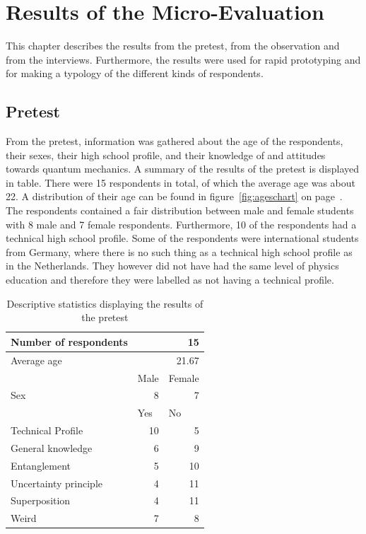\documentclass[11pt,twoside]{report} %
\begin{document}
\chapter{Results of the Micro-Evaluation}

This chapter describes the results from the pretest, from the observation and from the interviews. Furthermore, the results were used for rapid prototyping and for making a typology of the different kinds of respondents.

\section{Pretest}

From the pretest, information was gathered about the age of the respondents, their sexes, their high school profile, and their knowledge of and attitudes towards quantum mechanics. A summary of the results of the pretest is displayed in table. There were 15 respondents in total, of which the average age was about 22. A distribution of their age can be found in figure~\ref{fig:ageschart} on page~\pageref{fig:ageschart}. The respondents contained a fair distribution between male and female students with 8 male and 7 female respondents. Furthermore, 10 of the respondents had a technical high school profile. Some of the respondents were international students from Germany, where there is no such thing as a technical high school profile as in the Netherlands. They however did not have had the same level of physics education and therefore they were labelled as not having a technical profile.

\begin{table}[htbp]
\begin{center}
\begin{tabular}{|l|r|r|}
\hline
Number of respondents & \multicolumn{2}{r|}{15}  \\ \hline
Average age & \multicolumn{2}{r|}{21.67}  \\ \hline
 & \multicolumn{1}{l|}{Male} & \multicolumn{1}{l|}{Female} \\ \hline
Sex & 8 & 7 \\ \hline
 & \multicolumn{1}{l|}{Yes} & \multicolumn{1}{l|}{No} \\ \hline
Technical Profile & 10 & 5 \\ \hline
General knowledge & 6 & 9 \\ \hline
Entanglement & 5 & 10 \\ \hline
Uncertainty principle & 4 & 11 \\ \hline
Superposition & 4 & 11 \\ \hline
Weird & 7 & 8 \\ \hline
\end{tabular}
\caption{Descriptive statistics displaying the results of the pretest}
\end{center}
\label{tab:descriptive}
\end{table}
\end{document}
